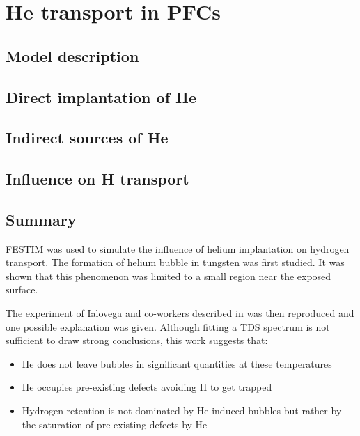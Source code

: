 \setchapterpreamble[u]{\margintoc}
\chapter{He transport in PFCs}
\label{Chapter5} %


\section{Model description}

\section{Direct implantation of He}

\section{Indirect sources of He}

\section{Influence on H transport}


\section{Summary}

FESTIM was used to simulate the influence of helium implantation on hydrogen transport.
The formation of helium bubble in tungsten was first studied.
It was shown that this phenomenon was limited to a small region near the exposed surface.

The experiment of Ialovega and co-workers described in  was then reproduced and one possible explanation was given.
Although fitting a TDS spectrum is not sufficient to draw strong conclusions, this work suggests that:
\begin{itemize}
    \item He does not leave bubbles in significant quantities at these temperatures
    \item He occupies pre-existing defects avoiding H to get trapped
    \item Hydrogen retention is not dominated by He-induced bubbles but rather by the saturation of pre-existing defects by He
\end{itemize}

